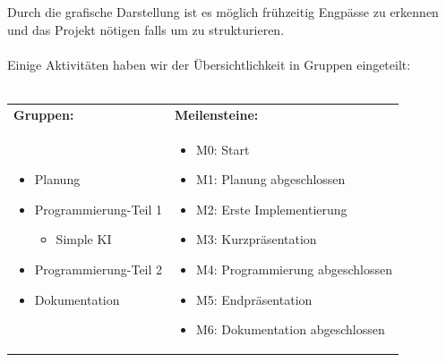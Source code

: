 Durch die grafische Darstellung ist es möglich frühzeitig Engpässe zu erkennen und das Projekt nötigen falls um zu strukturieren.
\\\\
Einige Aktivitäten haben wir der Übersichtlichkeit in Gruppen eingeteilt:\\\\
\begin{tabular}{p{}p{}}
	\textbf{Gruppen:} & \textbf{Meilensteine:}\\
	\begin{itemize}
		\item Planung
		\item Programmierung-Teil 1
		\begin{itemize}
			\item Simple KI
		\end{itemize}
		\item Programmierung-Teil 2
		\item Dokumentation
	\end{itemize} & 
	\begin{itemize}
		\item M0: Start
		\item M1: Planung abgeschlossen
		\item M2: Erste Implementierung
		\item M3: Kurzpräsentation
		\item M4: Programmierung abgeschlossen
		\item M5: Endpräsentation
		\item M6: Dokumentation abgeschlossen
	\end{itemize}\\
\end{tabular}
\\
